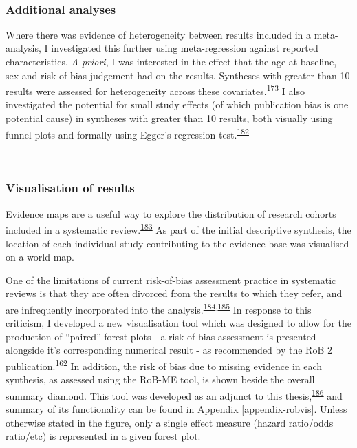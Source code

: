 \documentclass[a4paper, twoside]{templates/ociamthesis}
\begin{document}
~

\hypertarget{additional-analyses}{%
\subsubsection{Additional analyses}\label{additional-analyses}}

Where there was evidence of heterogeneity between results included in a meta-analysis, I investigated this further using meta-regression against reported characteristics. \emph{A priori}, I was interested in the effect that the age at baseline, sex and risk-of-bias judgement had on the results. Syntheses with greater than 10 results were assessed for heterogeneity across these covariates.\textsuperscript{\protect\hyperlink{ref-deeks2019}{173}} I also investigated the potential for small study effects (of which publication bias is one potential cause) in syntheses with greater than 10 results, both visually using funnel plots and formally using Egger's regression test.\textsuperscript{\protect\hyperlink{ref-sterne2011}{182}}

~

\hypertarget{sys-rev-visualising-results}{%
\subsubsection{Visualisation of results}\label{sys-rev-visualising-results}}

Evidence maps are a useful way to explore the distribution of research cohorts included in a systematic review.\textsuperscript{\protect\hyperlink{ref-saran2018}{183}} As part of the initial descriptive synthesis, the location of each individual study contributing to the evidence base was visualised on a world map.

One of the limitations of current risk-of-bias assessment practice in systematic reviews is that they are often divorced from the results to which they refer, and are infrequently incorporated into the analysis.\textsuperscript{\protect\hyperlink{ref-marusic2020}{184},\protect\hyperlink{ref-katikireddi2015}{185}} In response to this criticism, I developed a new visualisation tool which was designed to allow for the production of ``paired'' forest plots - a risk-of-bias assessment is presented alongside it's corresponding numerical result - as recommended by the RoB 2 publication.\textsuperscript{\protect\hyperlink{ref-sterne2019}{162}} In addition, the risk of bias due to missing evidence in each synthesis, as assessed using the RoB-ME tool, is shown beside the overall summary diamond. This tool was developed as an adjunct to this thesis,\textsuperscript{\protect\hyperlink{ref-mcguinness2020robvisPaper}{186}} and summary of its functionality can be found in Appendix \ref{appendix-robvis}. Unless otherwise stated in the figure, only a single effect measure (hazard ratio/odds ratio/etc) is represented in a given forest plot.
\end{document}
